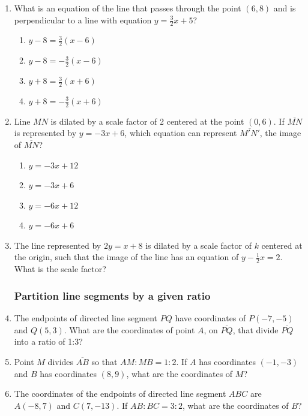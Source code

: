 \documentclass[12pt, oneside]{article}
\begin{document}
\begin{enumerate}[itemsep=0cm]
\item What is an equation of the line that passes through the point $(6,8)$
and is perpendicular to a line with equation $y=\frac{3}{2}x+5$?
  \begin{multicols}{2}
    \begin{enumerate}
      \item $y-8=\frac{3}{2}(x-6)$
      \item $y-8=-\frac{3}{2}(x-6)$ 
      \item $y+8=\frac{3}{2}(x+6)$
      \item $y+8=-\frac{3}{2}(x+6)$
    \end{enumerate}
  \end{multicols}

\item Line $MN$ is dilated by a scale factor of 2 centered at the point $(0,6)$. If $\overline{MN}$ is represented by $y=-3x+6$, which equation can represent $\overline{M'N'}$, the image of $\overline{MN}$?
  \begin{multicols}{2}
    \begin{enumerate}
      \item $y=-3x+12$
      \item $y=-3x+6$ 
      \item $y=-6x+12$
      \item $y=-6x+6$
    \end{enumerate}
  \end{multicols}

\item The line represented by $2y=x+8$ is dilated by a scale factor
of $k$ centered at the origin, such that the image of the line has an
equation of $y - \frac{1}{2} x=2$. What is the scale factor?
  
\newpage
\subsubsection*{Partition line segments by a given ratio}
\item The endpoints of directed line segment $PQ$ have coordinates of
$P(-7,-5)$ and $Q(5,3)$. What are the coordinates of point $A$, on $\overline{PQ}$,
that divide $\overline{PQ}$ into a ratio of 1:3?

\item Point $M$ divides $\overline{AB}$ so that $AM:MB = 1:2$. If $A$ has coordinates $(-1,-3)$ and $B$ has coordinates $(8,9)$, what are the coordinates of $M$?

\item The coordinates of the endpoints of directed line segment $ABC$ are $A(-8,7)$ and $C(7,-13)$. If $AB:BC = 3:2$, what are the coordinates of $B$?


\end{enumerate}
\end{document}
